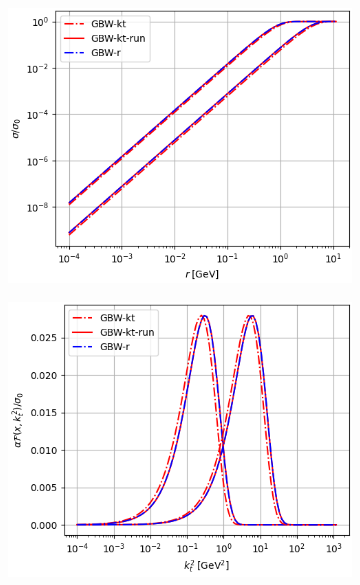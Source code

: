 \documentclass[11pt]{article}
\numberwithin{equation}{section}
\numberwithin{table}{section}
\numberwithin{figure}{section}
\begin{document}
\begin{figure}[t]
\begin{subfigure}{0.32\textwidth}
\includegraphics[width=\textwidth]{./plots/GBW-dipole.png}
\end{subfigure}
\begin{subfigure}{0.32\textwidth}
\includegraphics[width=\textwidth]{./plots/GBW-gluon.png}
\end{subfigure}
\begin{subfigure}{0.32\textwidth}

\end{subfigure}
\end{figure}
\end{document}
